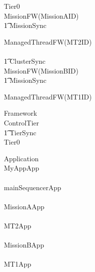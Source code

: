 \begin{circus}
\circprocess Tier0 \circdef \\

\circblockopen
	MissionFW(MissionAID)\\
		\t1 	\lpar MissionSync \rpar \\
		\circblockopen



			ManagedThreadFW(MT2ID)\\








		\circblockclose
\circblockclose
	\\ \t1 \lpar ClusterSync \rpar \\

\circblockopen
	MissionFW(MissionBID)\\
		\t1 	\lpar MissionSync \rpar \\
		\circblockopen



			ManagedThreadFW(MT1ID)\\








		\circblockclose
\circblockclose
\end{circus}
%
%
%
\begin{circus}
\circprocess Framework \circdef \\
\circblockopen
ControlTier \\
\t1 \lpar TierSync \rpar \\
 \circblockopen
Tier0
\circblockclose
\circblockclose
\end{circus}
%
%
\begin{circus}
\circprocess  Application \circdef \\
\circblockopen
MyAppApp\\
\interleave\\
mainSequencerApp\\
\interleave \\
		MissionAApp\\
		\interleave \\
			MT2App\\
			
		\interleave \\
		MissionBApp\\
		\interleave \\
			MT1App\\
			
		
\circblockclose
\end{circus}
